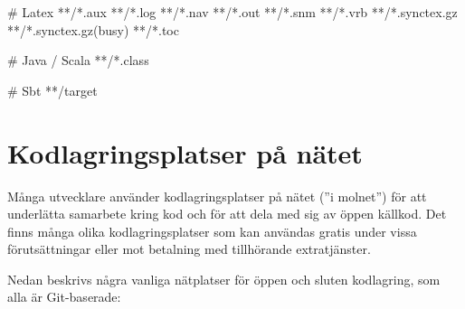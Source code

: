 \begin{itemize}[leftmargin=*]
\begin{Code}[language=]
# Latex
**/*.aux
**/*.log
**/*.nav
**/*.out
**/*.snm
**/*.vrb
**/*.synctex.gz
**/*.synctex.gz(busy)
**/*.toc

# Java / Scala
**/*.class

# Sbt
**/target

\end{Code} 


\end{itemize}
 
 
  
\section{Kodlagringsplatser på nätet}

Många utvecklare använder kodlagringsplatser på nätet (''i molnet'') för att underlätta samarbete kring kod och för att dela med sig av öppen källkod. Det finns många olika kodlagringsplatser som kan användas gratis under vissa förutsättningar eller mot betalning med tillhörande extratjänster. 

Nedan beskrivs några vanliga nätplatser för öppen och sluten kodlagring, som alla är Git-baserade:

